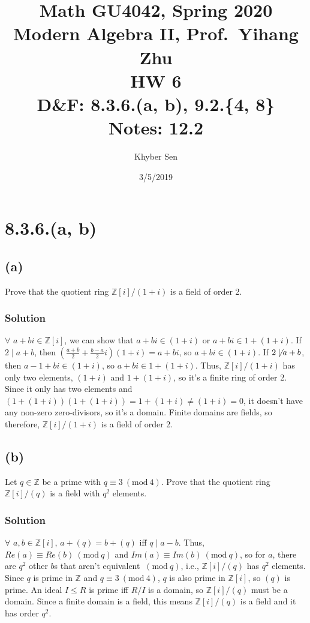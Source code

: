 \documentclass[fleqn]{article}
\title{
Math GU4042, Spring 2020 \\
Modern Algebra II, Prof.\ Yihang Zhu \\
HW 6 \\
D\&F: 8.3.6.(a, b), 9.2.\{4, 8\} \\
Notes: 12.2 \\
}
\author{Khyber Sen}
\date{3/5/2019}
\newcommand{\Mod}[1]{\ (\mathrm{mod}\ #1)}
\begin{document}
    
    \maketitle
    
    \section{8.3.6.(a, b)}
        
        \subsection{(a)}
        Prove that the quotient ring $\mathbb{Z}[i]/(1 + i)$ is a field of order 2.
            
            \subsubsection{Solution}
            $\forall$ $a + bi \in \mathbb{Z}[i]$, we can show that $a + bi \in (1 + i)$ or $a + bi \in 1 + (1 + i)$.  If $2 \mid a + b$, then $\left(\frac{a + b}{2} + \frac{b - a}{2}i\right)(1 + i) = a + bi$, so $a + bi \in (1 + i)$.  If $2 \not\mid a + b$, then $a - 1 + bi \in (1 + i)$, so $a + bi \in 1 + (1 + i)$.  Thus, $\mathbb{Z}[i]/(1 + i)$ has only two elements, $(1 + i)$ and $1 + (1 + i)$, so it's a finite ring of order 2.  Since it only has two elements and $(1 + (1 + i))(1 + (1 + i)) = 1 + (1 + i) \neq (1 + i) = 0$, it doesn't have any non-zero zero-divisors, so it's a domain.  Finite domains are fields, so therefore, $\mathbb{Z}[i]/(1 + i)$ is a field of order 2.
        
        \subsection{(b)}
        Let $q \in \mathbb{Z}$ be a prime with $q \equiv 3 \Mod{4}$.  Prove that the quotient ring $\mathbb{Z}[i]/(q)$ is a field with $q^2$ elements.
        
            \subsubsection{Solution}
            $\forall$ $a, b \in \mathbb{Z}[i]$, $a + (q) = b + (q)$ iff $q \mid a - b$.  Thus, $Re(a) \equiv Re(b) \Mod{q}$ and $Im(a) \equiv Im(b) \Mod{q}$, so for $a$, there are $q^2$ other $b$s that aren't equivalent $\Mod{q}$, i.e., $\mathbb{Z}[i]/(q)$ has $q^2$ elements.  Since $q$ is prime in $\mathbb{Z}$ and $q \equiv 3 \Mod{4}$, $q$ is also prime in $\mathbb{Z}[i]$, so $(q)$ is prime.  An ideal $I \leq R$ is prime iff $R/I$ is a domain, so $\mathbb{Z}[i]/(q)$ must be a domain.  Since a finite domain is a field, this means $\mathbb{Z}[i]/(q)$ is a field and it has order $q^2$.
            
\end{document}
